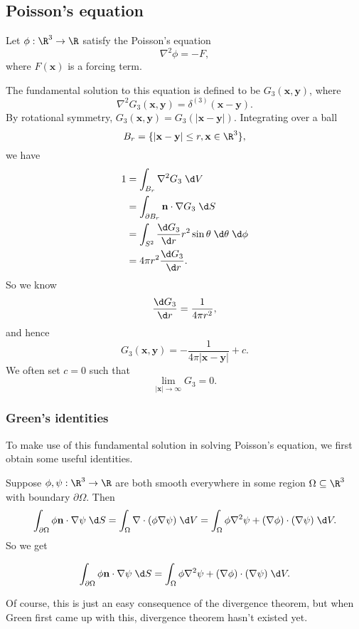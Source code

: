 \documentclass[a4paper]{article}
\begin{document}
\subsection{Poisson's equation}
Let $\phi: \R^3 \to \R$ satisfy the Poisson's equation
\[
  \nabla^2 \phi = -F,
\]
where $F(\mathbf{x})$ is a forcing term.

The fundamental solution to this equation is defined to be $G_3(\mathbf{x}, \mathbf{y})$, where
\[
  \nabla^2 G_3(\mathbf{x}, \mathbf{y}) = \delta^{(3)}(\mathbf{x} - \mathbf{y}).
\]
By rotational symmetry, $G_3(\mathbf{x}, \mathbf{y}) = G_3(|\mathbf{x} - \mathbf{y}|)$. Integrating over a ball
\[
  B_r = \{|\mathbf{x} - \mathbf{y}| \leq r, \mathbf{x} \in \R^3\},
\]
we have
\begin{align*}
  1 &= \int_{B_r} \nabla^2 G_3\;\d V \\
  &= \int_{\partial B_r} \mathbf{n}\cdot \nabla G_3 \;\d S\\
  &= \int_{S^2} \frac{\d G_3}{\d r} r^2 \sin \theta \;\d \theta \;\d \phi\\
  &= 4\pi r^2 \frac{\d G_3}{\;\d r}.
\end{align*}
So we know
\[
  \frac{\d G_3}{\d r} = \frac{1}{4\pi r^2},
\]
and hence
\[
  G_3(\mathbf{x}, \mathbf{y}) = -\frac{1}{4\pi |\mathbf{x} - \mathbf{y}|} + c.
\]
We often set $c = 0$ such that
\[
  \lim_{|\mathbf{x}| \to \infty} G_3 = 0.
\]
\subsubsection*{Green's identities}
To make use of this fundamental solution in solving Poisson's equation, we first obtain some useful identities.

Suppose $\phi, \psi: \R^3 \to \R$ are both smooth everywhere in some region $\Omega \subseteq \R^3$ with boundary $\partial \Omega$. Then
\[
  \int_{\partial \Omega} \phi\mathbf{n} \cdot \nabla \psi\;\d S = \int_\Omega \nabla\cdot (\phi \nabla \psi) \;\d V = \int_\Omega \phi \nabla^2 \psi + (\nabla \phi)\cdot (\nabla \psi)\;\d V.
\]
So we get
\begin{prop}
\[
  \int_{\partial \Omega} \phi\mathbf{n} \cdot \nabla \psi\;\d S = \int_\Omega \phi \nabla^2 \psi + (\nabla \phi)\cdot (\nabla \psi)\;\d V.
\]
\end{prop}
Of course, this is just an easy consequence of the divergence theorem, but when Green first came up with this, divergence theorem hasn't existed yet.
\end{document}
